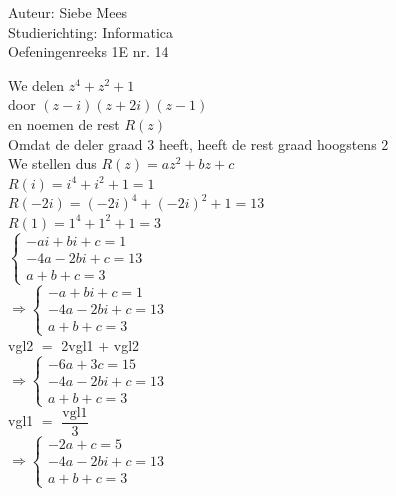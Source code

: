 \documentclass[a4paper]{article}
\begin{document}
  
\noindent \large Auteur: Siebe Mees \\
\noindent \large Studierichting: Informatica\\
\noindent \large Oefeningenreeks 1E nr. 14\\

\medskip

\normalsize

We delen $z^4+z^2+1$\\

door $(z-i)(z+2i)(z-1)$\\

en noemen de rest $R(z)$\\

Omdat de deler graad $3$ heeft, heeft de rest graad hoogstens $2$\\

We stellen dus $R(z)=az^2+bz+c$\\

$R(i)=i^4+i^2+1=1$\\

$R(-2i)=(-2i)^4+(-2i)^2+1=13$\\

$R(1)=1^4+1^2+1=3$\\

$ \left \{
\begin{array}{l}
-ai+bi+c=1\\
-4a-2bi+c=13\\
a+b+c=3
\end{array}
\right .$\\

$ \Rightarrow \left \{
\begin{array}{l}
-a+bi+c=1\\
-4a-2bi+c=13\\
a+b+c=3
\end{array}
\right .$\\

vgl2 $=$ 2vgl1 $+$ vgl2\\

$ \Rightarrow \left \{
\begin{array}{l}
-6a+3c=15\\
-4a-2bi+c=13\\
a+b+c=3
\end{array}
\right .$\\

vgl1 $=$ $\dfrac{\text{vgl1}}{3}$\\

$ \Rightarrow \left \{
\begin{array}{l}
-2a+c=5\\
-4a-2bi+c=13\\
a+b+c=3
\end{array}
\right .$\\
\end{document}
